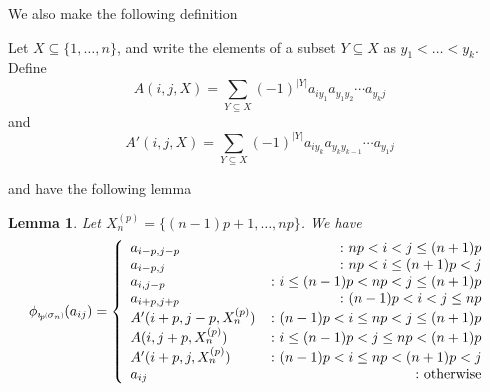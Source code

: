 \documentclass[11pt]{amsart}
\def\s{{\sigma}}
\newcommand*{\subsmallp}[1]{\scalebox{.5}{\ensuremath#1}}
\newcommand{\subpp}[2][p]{\imath_{\hspace*{-1pt}#1}\hspace*{-.5pt}\subsmallp(#2\subsmallp)}
\newtheorem{lem}[thm]{Lemma}
\theoremstyle{definition}
\begin{document}
\noindent We also make the following definition

\noindent Let $X\subseteq \{1,\ldots,n\}$, and write the elements of a subset $Y\subseteq X$ as $y_1<\ldots <y_k$.  Define
$$
 A(i,j,X) = \sum_{Y\subseteq X}(-1)^{|Y|}a_{iy_1}a_{y_1y_2}\cdots a_{y_kj}
$$
and
$$
 A'(i,j,X) = \sum_{Y\subseteq X}(-1)^{|Y|}a_{iy_k}a_{y_ky_{k-1}}\cdots a_{y_1j}
$$



\noindent and have the following lemma

\begin{lem}\label{Sigma_n}
Let $X_n^{(p)} = \{(n-1)p+1,\ldots,np\}$.  We have
$$
\phi_{\subpp{\s_n}}(a_{ij}) =
\left\{
     \begin{array}{lr}
       a_{i-p,j-p} & \colon np< i<j\le (n+1)p\\
       a_{i-p,j} &\colon np< i\le (n+1)p< j\\
       a_{i,j-p} & \colon i\le(n-1)p<np< j\le(n+1)p\\
       a_{i+p,j+p} &\colon (n-1)p< i<j\le np\\
       A'(i+p,j-p,X_n^{(p)}) & \colon (n-1)p< i\le np< j \le (n+1)p\\
       A(i,j+p,X_n^{(p)}) & \colon i\le(n-1)p< j \le np<(n+1)p\\
       A'(i+p,j,X_n^{(p)}) & \colon (n-1)p< i \le np<(n+1)p< j\\
       a_{ij} & \colon \textnormal{otherwise}
     \end{array}
\right.
$$
\end{lem}
\end{document}
